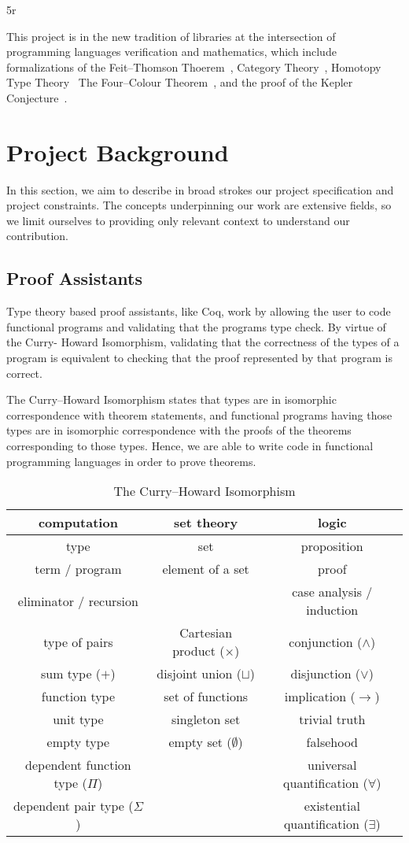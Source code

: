 5r\documentclass{article}
\theoremstyle{definition}
\begin{document}
This project is in the new tradition of libraries at the intersection of programming languages verification and mathematics, which include formalizations of the Feit--Thomson Thoerem~\cite{Gonthier2013}, Category Theory~\cite{category-coq-experience}, Homotopy Type Theory~\cite{Bauer:2017:HLF:3018610.3018615} The Four--Colour Theorem~\cite{gonthier2005computer,gonthier2008formal}, and the proof of the Kepler Conjecture~\cite{hales2015formal}. 


\section{Project Background}
In this section, we aim to describe in broad strokes our project specification and project constraints. The concepts underpinning our work are extensive fields, so we limit ourselves to providing only relevant context to understand our contribution. 

\subsection{Proof Assistants}
Type theory based proof assistants, like Coq, work by allowing the user to code functional programs and validating that the programs type check. By virtue of the Curry- Howard Isomorphism, validating that the correctness of the types of a program is equivalent to checking that the proof represented by that program is correct. 

The Curry--Howard Isomorphism states that types are in isomorphic correspondence with theorem statements, and functional programs having those types are in isomorphic correspondence with the proofs of the theorems corresponding to those types. Hence, we are able to write code in functional programming languages in order to prove theorems.

\begin{table}[t]
\centering
\noindent
\begin{tabular}{c|c|c}
computation & set theory & logic \\ \hline
type & set & proposition \\
term / program & element of a set & proof \\
eliminator / recursion & & case analysis / induction \\
type of pairs & Cartesian product ($\times$) & conjunction ($\wedge$) \\
sum type ($+$) & disjoint union ($\sqcup$) & disjunction ($\vee$) \\
function type & set of functions & implication ($\to$) \\
unit type & singleton set & trivial truth \\
empty type & empty set ($\emptyset$) & falsehood \\
dependent function type ($\Pi$) & & universal quantification ($\forall$) \\
dependent pair type ($\Sigma$) & & existential quantification ($\exists$)
\end{tabular}
\caption{The Curry--Howard Isomorphism}
\label{tab:curry-howard}
\end{table}
\end{document}
